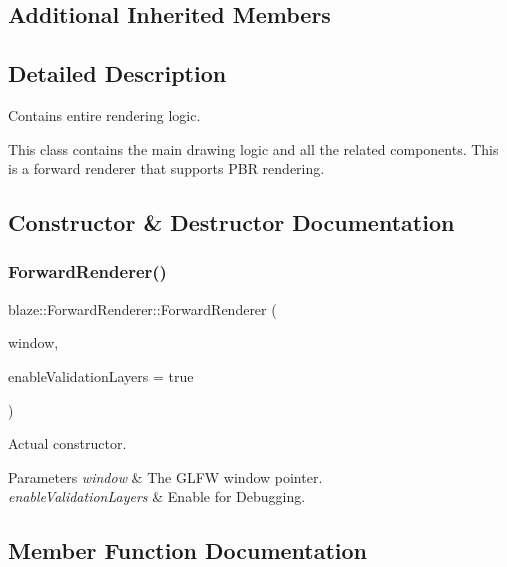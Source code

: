 \subsection*{Additional Inherited Members}


\subsection{Detailed Description}
Contains entire rendering logic. 

This class contains the main drawing logic and all the related components. This is a forward renderer that supports P\+BR rendering. 

\subsection{Constructor \& Destructor Documentation}
\mbox{\label{classblaze_1_1ForwardRenderer_abf0b80128aa61686461b3069004b65a9}} 
\subsubsection{\texorpdfstring{Forward\+Renderer()}{ForwardRenderer()}}
{\footnotesize\ttfamily blaze\+::\+Forward\+Renderer\+::\+Forward\+Renderer (\begin{DoxyParamCaption}\item[{G\+L\+F\+Wwindow $\ast$}]{window,  }\item[{bool}]{enable\+Validation\+Layers = {\ttfamily true} }\end{DoxyParamCaption})\hspace{0.3cm}{\ttfamily [noexcept]}}



Actual constructor. 


\begin{DoxyParams}{Parameters}
{\em window} & The G\+L\+FW window pointer. \\
\hline
{\em enable\+Validation\+Layers} & Enable for Debugging. \\
\hline
\end{DoxyParams}


\subsection{Member Function Documentation}
\mbox{\label{classblaze_1_1ForwardRenderer_a78175e4b430f0046db968f8476ec121c}} 
